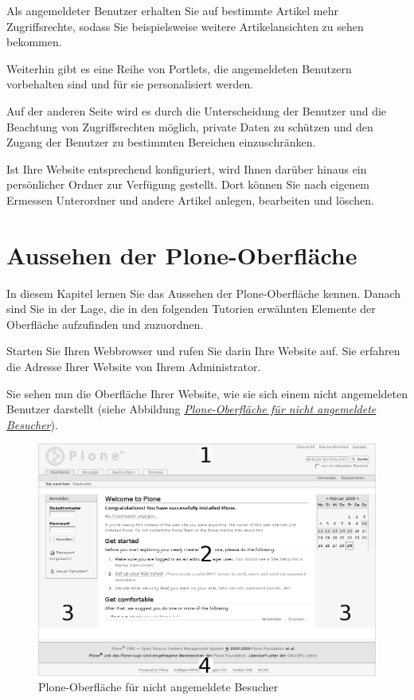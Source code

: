 \documentclass[a4paper,12pt,ngerman]{manual}
\begin{document}
Als angemeldeter Benutzer erhalten Sie auf bestimmte Artikel mehr
Zugriffsrechte, sodass Sie beispielsweise weitere Artikelansichten zu sehen
bekommen.

Weiterhin gibt es eine Reihe von Portlets, die angemeldeten Benutzern
vorbehalten sind und für sie personalisiert werden.

Auf der anderen Seite wird es durch die Unterscheidung der Benutzer
und die Beachtung von Zugriffsrechten möglich, private Daten zu
schützen und den Zugang der Benutzer zu bestimmten Bereichen
einzuschränken.

Ist Ihre Website entsprechend konfiguriert, wird Ihnen darüber
hinaus ein persönlicher Ordner zur Verfügung gestellt. Dort können Sie
nach eigenem Ermessen Unterordner und andere Artikel anlegen,
bearbeiten und löschen.

\resetcurrentobjects
\hypertarget{--doc-aussehen/aussehen}{}

\hypertarget{aussehen}{}\chapter{Aussehen der Plone-Oberfläche}

In diesem Kapitel lernen Sie das Aussehen der Plone-Oberfläche kennen.
Danach sind Sie in der Lage, die in den folgenden Tutorien erwähnten
Elemente der Oberfläche aufzufinden und zuzuordnen.

Starten Sie Ihren Webbrowser und rufen Sie darin Ihre Website auf. Sie
erfahren die Adresse Ihrer Website von Ihrem Administrator.

Sie sehen nun die Oberfläche Ihrer Website, wie sie sich einem nicht
angemeldeten Benutzer darstellt (siehe
Abbildung \hyperlink{fig-plonebase}{\emph{Plone-Oberfläche für nicht angemeldete Besucher}}).
\hypertarget{fig-plonebase}{}\begin{figure}[htbp]
\centering

\includegraphics[width=1.000\linewidth]{plonebase.png}
\caption{Plone-Oberfläche für nicht angemeldete Besucher}\end{figure}
\end{document}
